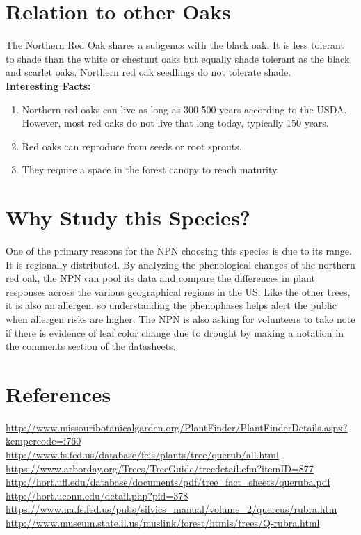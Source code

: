 \documentclass{article}\usepackage[]{graphicx}\usepackage[]{color}
\begin{document}
\section*{Relation to other Oaks}
The Northern Red Oak shares a subgenus with the black oak. It is less tolerant to shade than the white or chestnut oaks but equally shade tolerant as the black and scarlet oaks. Northern red oak seedlings do not tolerate shade. 
\\
{\textbf{Interesting Facts:}}
\begin{enumerate}
\item{Northern red oaks can live as long as 300-500 years according to the USDA. However, most red oaks do not live that long today, typically 150 years.}
\item{Red oaks can reproduce from seeds or root sprouts.}
\item{They require a space in the forest canopy to reach maturity.}
\end{enumerate}
\section*{Why Study this Species?}
One of the primary reasons for the NPN choosing this species is due to its range. It is regionally distributed. By analyzing the phenological changes of the northern red oak, the NPN can pool its data and compare the differences in plant responses across the various geographical regions in the US. Like the other trees, it is also an allergen, so understanding the phenophases helps alert the public when allergen risks are higher. The NPN is also asking for volunteers to take note if there is evidence of leaf color change due to drought by making a notation in the comments section of the datasheets. 
\newpage
\section*{References}
\url{http://www.missouribotanicalgarden.org/PlantFinder/PlantFinderDetails.aspx?kempercode=i760} \\
\url{http://www.fs.fed.us/database/feis/plants/tree/querub/all.html} \\
\url{https://www.arborday.org/Trees/TreeGuide/treedetail.cfm?itemID=877} \\
\url{http://hort.ufl.edu/database/documents/pdf/tree_fact_sheets/queruba.pdf} \\
\url{http://hort.uconn.edu/detail.php?pid=378}\\
\url{https://www.na.fs.fed.us/pubs/silvics_manual/volume_2/quercus/rubra.htm}\\
\url{http://www.museum.state.il.us/muslink/forest/htmls/trees/Q-rubra.html}
\end{document}
